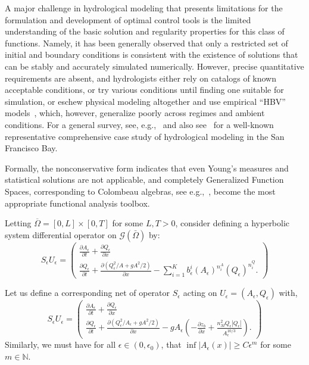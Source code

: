 \documentclass{article}
\newcommand{\1}{\mathds{1}}          %
\theoremstyle{definition}
\begin{document}
\begin{sloppypar}
A major challenge in hydrological modeling that presents limitations for the formulation and development of optimal control tools is the limited understanding of the basic solution and regularity properties for this class of functions. Namely, it has been generally observed that only a restricted set of initial and boundary conditions is consistent with the existence of solutions that can be stably and accurately simulated numerically. However, precise quantitative requirements are absent, and hydrologists either rely on catalogs of known acceptable conditions, or try various conditions until finding one suitable for simulation, or eschew physical modeling altogether and use empirical ``HBV'' models~\cite{bergstrom2015interpretation}, which, however, generalize poorly across regimes and ambient conditions. 
For a general survey, see, e.g.,~\cite{paniconi2015physically} and also see~\cite{cheng1993tidal} for a well-known representative comprehensive case study of hydrological modeling in the San Francisco Bay.

Formally, the nonconservative form indicates that even Young's measures and statistical solutions are not applicable, and completely Generalized Function Spaces, corresponding to Colombeau algebras, see e.g.,~\cite{colombeau2011elementary}, become the most appropriate functional analysis toolbox.


Letting $\overline{\Omega}=[0,L]\times[0,T]$ for some $L,T>0$, consider defining a hyperbolic system differential operator on $\mathcal{G}\left(\bar{\Omega}\right)$ by:
\begin{equation}\label{eq:diffop}
S_{\epsilon} U_{\epsilon} = \begin{pmatrix}
\frac{\partial A_{\epsilon}}{\partial t}+\frac{\partial Q_{\epsilon}}{\partial x} \\
 \frac{\partial Q_{\epsilon}}{\partial t} +\frac{\partial(Q_{\epsilon}^2/A+g A^2/2)}{\partial x}-\sum\limits_{i=1}^K b^i_{\epsilon} (A_{\epsilon})^{n^A_i}(Q_{\epsilon})^{n^Q_i}.     
\end{pmatrix}
\end{equation}


Let us define a corresponding net of operator $S_{\epsilon}$ acting on $U_{\epsilon}=(A_{\epsilon},Q_{\epsilon})$ with,
\begin{equation}\label{eq:netsaintven}
    S_{\epsilon} U_{\epsilon} = \begin{pmatrix}
\frac{\partial A_{\epsilon}}{\partial t}+\frac{\partial Q_{\epsilon}}{\partial x} \\
 \frac{\partial Q_\epsilon}{\partial t} +\frac{\partial(Q_\epsilon^2/A_\epsilon+g A^2/2)}{\partial x}-g A_{\epsilon}\left(-\frac{\partial z_b}{\partial x}+\frac{n_M^2 Q_{\epsilon} |Q_{\epsilon}|}{A^{10/3}_{\epsilon}}\right).       
    \end{pmatrix}
\end{equation}
Similarly, we must have for all $\epsilon\in (0,\epsilon_0)$, that $\inf \left|A_{\epsilon}(x)\right|\ge C \epsilon^m$ for some $m\in \mathbb{N}$.



\end{sloppypar}
\end{document}
